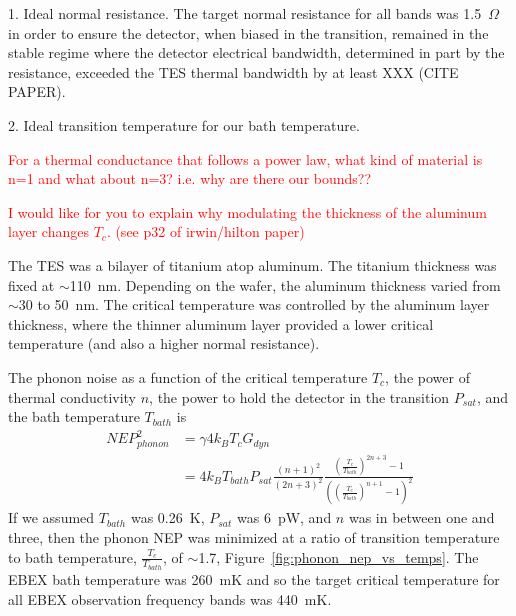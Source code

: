 
1. Ideal normal resistance.  
The target normal resistance for all bands was 1.5~$\Omega$ in order to ensure the detector, when biased in the transition, remained in the stable regime where the detector electrical bandwidth, determined in part by the resistance, exceeded the \ac{TES} thermal bandwidth by at least XXX (CITE PAPER). 

2. Ideal transition temperature for our bath temperature. 


\textcolor{red}{For a thermal conductance that follows a power law, what kind of material is n=1 and what about n=3? i.e. why are there our bounds??}

\textcolor{red}{I would like for you to explain why modulating the thickness of the aluminum layer changes $T_{c}$. (see p32 of irwin/hilton paper)}


The \ac{TES} was a bilayer of titanium atop aluminum. 
The titanium thickness was fixed at $\sim$110~nm. 
Depending on the wafer, the aluminum thickness varied from $\sim$30 to 50~nm. 
The critical temperature was controlled by the aluminum layer thickness, where the thinner aluminum layer provided a lower critical temperature (and also a higher normal resistance). 

The phonon noise as a function of the critical temperature $T_{c}$, the power of thermal conductivity $n$,  the power to hold the detector in the transition $P_{sat}$, and the bath temperature $T_{bath}$ is
\begin{equation}
\label{eq:phonon_nep}
\begin{split}
NEP_{phonon}^2 & = \gamma4k_{B}T_{c}G_{dyn} \\
& = 4k_{B}T_{bath}P_{sat}\frac{(n+1)^{2}}{(2n+3)^2}\frac{\left(\frac{T_{c}}{T_{bath}}\right)^{2n+3}-1}{\left( \left(\frac{T_{c}}{T_{bath}}\right)^{n+1}-1\right)^{2}}
\end{split}
\end{equation}
If we assumed $T_{bath}$ was 0.26~K, $P_{sat}$ was 6~pW, and $n$ was in between one and three, then the phonon \ac{NEP} was minimized at a ratio of transition temperature to bath temperature, $\frac{T_{c}}{T_{bath}}$, of $\sim$1.7, Figure~\ref{fig:phonon_nep_vs_temps}. 
The \ac{EBEX} bath temperature was 260~mK and so the target critical temperature for all \ac{EBEX} observation frequency bands was 440~mK.

